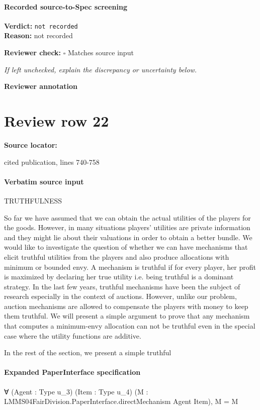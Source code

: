 \documentclass[10pt]{article}
\newcommand{\reviewerbox}{%
  \par\noindent\fbox{\parbox{0.96\linewidth}{\rule{0pt}{0.38in}}}\par
}
\newcommand{\reviewmatch}[1]{%
  \par\noindent\textbf{Reviewer check:} $\square$\; #1\par
  \noindent\emph{If left unchecked, explain the discrepancy or uncertainty below.}\par
}
\begin{document}
\paragraph{Recorded source-to-Spec screening}
\textbf{Verdict:} \texttt{not recorded}
\\
\textbf{Reason:} not recorded
\reviewmatch{Matches source input}
\noindent\textbf{Reviewer annotation}\par
\reviewerbox
\clearpage
\hypertarget{source-claim-069877ce7f94a642}{}
\section*{Review row 22}
\textbf{Source locator:} {\footnotesize\raggedright cited publication, lines 740-\allowbreak{}758\par}
\paragraph{Verbatim source input}
\begin{ReviewVerbatim}
TRUTHFULNESS

So far we have assumed that we can obtain the actual
utilities of the players for the goods. However, in many situations players’ utilities are private information and they
might lie about their valuations in order to obtain a better
bundle. We would like to investigate the question of whether
we can have mechanisms that elicit truthful utilities from
the players and also produce allocations with minimum or
bounded envy. A mechanism is truthful if for every player,
her profit is maximized by declaring her true utility i.e. being truthful is a dominant strategy.
In the last few years, truthful mechanisms have been the
subject of research especially in the context of auctions.
However, unlike our problem, auction mechanisms are allowed to compensate the players with money to keep them
truthful.
We will present a simple argument to prove that any mechanism that computes a minimum-envy allocation can not be
truthful even in the special case where the utility functions
are additive.

In the rest of the section, we present a simple truthful
\end{ReviewVerbatim}


\paragraph{Expanded PaperInterface specification}
\begin{ReviewVerbatim}
∀ (Agent : Type u_3) (Item : Type u_4) (M : LMMS04FairDivision.PaperInterface.directMechanism Agent Item), M = M
\end{ReviewVerbatim}
\end{document}
